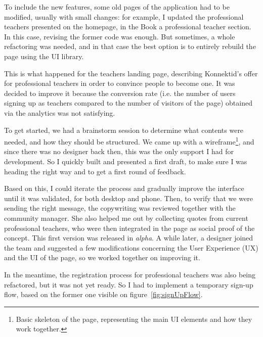 To include the new features, some old pages of the application had to be modified, usually with small changes: for example, I updated the professional teachers presented on the homepage, in the \guillemotleft{} Book a professional teacher \guillemotright{} section. In this case, revising the former code was enough. But sometimes, a whole refactoring was needed, and in that case the best option is to entirely rebuild the page using the UI library. 

This is what happened for the teachers landing page, describing Konnektid's offer for professional teachers in order to convince people to become one. It was decided to improve it because the conversion rate (i.e. the number of users signing up as teachers compared to the number of visitors of the page) obtained via the analytics was not satisfying. 

To get started, we had a brainstorm session to determine what contents were needed, and how they should be structured. We came up with a wireframe\footnote{Basic skeleton of the page, representing the main UI elements and how they work together.}, and since there was no designer back then, this was the only support I had for development. So I quickly built and presented a first draft, to make sure I was heading the right way and to get a first round of feedback.

Based on this, I could iterate the process and gradually improve the interface until it was validated, for both desktop and phone. Then, to verify that we were sending the right message, the copywriting was reviewed together with the community manager. She also helped me out by collecting quotes from current professional teachers, who were then integrated in the page as social proof of the concept. This first version was released in \textit{alpha}. A while later, a designer joined the team and suggested a few modifications concerning the User Experience (UX) and the UI of the page, so we worked together on improving it. 

In the meantime, the registration process for professional teachers was also being refactored, but it was not yet ready. So I had to implement a temporary sign-up flow, based on the former one visible on {\sc figure}~\ref{fig:signUpFlow}.

